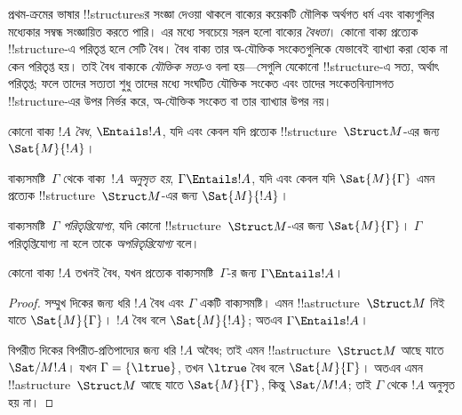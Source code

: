 \documentclass[../../../include/open-logic-section]{subfiles}
\begin{document}

\begin{explain}
প্রথম-ক্রমের ভাষার !!{structure}sর সংজ্ঞা দেওয়া থাকলে বাক্যের কয়েকটি
মৌলিক অর্থগত ধর্ম এবং বাক্যগুলির মধ্যেকার সম্বন্ধ সংজ্ঞায়িত করতে পারি।
এর মধ্যে সবচেয়ে সরল হলো বাক্যের \emph{বৈধতা}। কোনো বাক্য প্রত্যেক
!!{structure}-এ পরিতৃপ্ত হলে সেটি বৈধ। বৈধ বাক্য তার অ-যৌক্তিক
সংকেতগুলিকে যেভাবেই ব্যাখ্যা করা হোক না কেন পরিতৃপ্ত হয়। তাই বৈধ
বাক্যকে \emph{যৌক্তিক সত্য}-ও বলা হয়—সেগুলি যেকোনো !!{structure}-এ
সত্য, অর্থাৎ পরিতৃপ্ত; ফলে তাদের সত্যতা শুধু তাদের মধ্যে সংঘটিত যৌক্তিক
সংকেত এবং তাদের সংকেতবিন্যাসগত !!{structure}-এর উপর নির্ভর করে,
অ-যৌক্তিক সংকেত বা তার ব্যাখ্যার উপর নয়।
\end{explain}

\begin{defn}[বৈধতা]
কোনো বাক্য $!A$ \emph{বৈধ}, $\Entails !A$, যদি এবং কেবল যদি প্রত্যেক
!!{structure}~$\Struct M$-এর জন্য $\Sat{M}{!A}$।
\end{defn}

\begin{defn}[ফলশ্রুতি]
বাক্যসমষ্টি~$\Gamma$ থেকে বাক্য~$!A$ \emph{অনুসৃত হয়},
$\Gamma \Entails !A$, যদি এবং কেবল যদি $\Sat{M}{\Gamma}$ এমন প্রত্যেক
!!{structure}~$\Struct M$-এর জন্য $\Sat{M}{!A}$।
\end{defn}


\begin{defn}[পরিতৃপ্তিযোগ্যতা]
বাক্যসমষ্টি~$\Gamma$ \emph{পরিতৃপ্তিযোগ্য}, যদি কোনো
!!{structure}~$\Struct M$-এর জন্য $\Sat{M}{\Gamma}$। $\Gamma$
পরিতৃপ্তিযোগ্য না হলে তাকে \emph{অপরিতৃপ্তিযোগ্য} বলে।
\end{defn}

\begin{prop}
কোনো বাক্য $!A$ তখনই বৈধ, যখন প্রত্যেক বাক্যসমষ্টি~$\Gamma$-র জন্য
$\Gamma \Entails !A$।
\end{prop}

\begin{proof}
সম্মুখ দিকের জন্য ধরি $!A$ বৈধ এবং $\Gamma$ একটি বাক্যসমষ্টি। এমন
!!a{structure}~$\Struct M$ নিই যাতে $\Sat{M}{\Gamma}$। $!A$ বৈধ বলে
$\Sat{M}{!A}$; অতএব $\Gamma \Entails !A$।

বিপরীত দিকের বিপরীত-প্রতিপাদ্যের জন্য ধরি $!A$ অবৈধ; তাই এমন
!!a{structure}~$\Struct M$ আছে যাতে $\Sat/{M}{!A}$। যখন
$\Gamma = \{ \ltrue \}$, তখন $\ltrue$ বৈধ বলে $\Sat{M}{\Gamma}$।
অতএব এমন !!a{structure}~$\Struct M$ আছে যাতে $\Sat{M}{\Gamma}$,
কিন্তু $\Sat/{M}{!A}$; তাই $\Gamma$ থেকে $!A$ অনুসৃত হয় না।
\end{proof}
\end{document}
